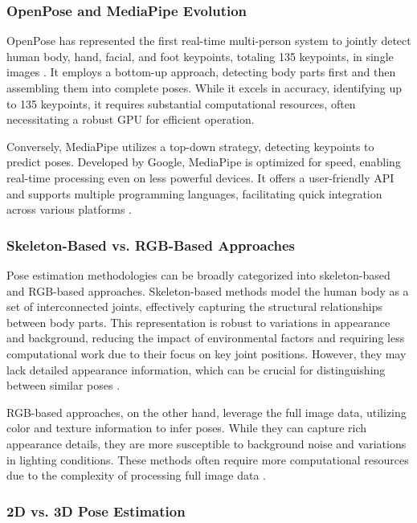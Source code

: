 \subsubsection{OpenPose and MediaPipe Evolution}

OpenPose has represented the first real-time multi-person system to jointly detect human body, hand, facial, and foot keypoints, totaling 135 keypoints, in single images \cite{openpose_github}. It employs a bottom-up approach, detecting body parts first and then assembling them into complete poses. While it excels in accuracy, identifying up to 135 keypoints, it requires substantial computational resources, often necessitating a robust GPU for efficient operation.

Conversely, MediaPipe utilizes a top-down strategy, detecting keypoints to predict poses. Developed by Google, MediaPipe is optimized for speed, enabling real-time processing even on less powerful devices. It offers a user-friendly API and supports multiple programming languages, facilitating quick integration across various platforms \cite{mediapipe_vs_openpose}.

\subsubsection{Skeleton-Based vs. RGB-Based Approaches}

Pose estimation methodologies can be broadly categorized into skeleton-based and RGB-based approaches. Skeleton-based methods model the human body as a set of interconnected joints, effectively capturing the structural relationships between body parts. This representation is robust to variations in appearance and background, reducing the impact of environmental factors and requiring less computational work due to their focus on key joint positions. However, they may lack detailed appearance information, which can be crucial for distinguishing between similar poses \cite{rgb_vs_skeleton}.

RGB-based approaches, on the other hand, leverage the full image data, utilizing color and texture information to infer poses. While they can capture rich appearance details, they are more susceptible to background noise and variations in lighting conditions. These methods often require more computational resources due to the complexity of processing full image data \cite{rgb_vs_skeleton}.

\subsubsection{2D vs. 3D Pose Estimation}

